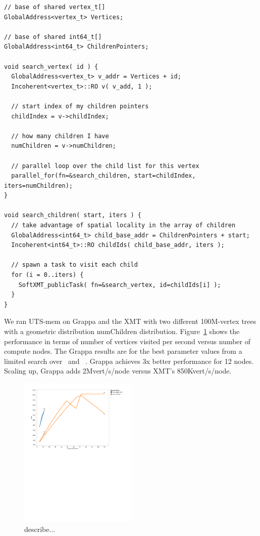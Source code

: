 \lstset{language=C++,
       basicstyle=\footnotesize,
       tabsize=2}
\begin{lstlisting}
// base of shared vertex_t[]
GlobalAddress<vertex_t> Vertices;        

// base of shared int64_t[]
GlobalAddress<int64_t> ChildrenPointers;  

void search_vertex( id ) {
  GlobalAddress<vertex_t> v_addr = Vertices + id;
  Incoherent<vertex_t>::RO v( v_add, 1 );

  // start index of my children pointers
  childIndex = v->childIndex;    

  // how many children I have
  numChildren = v->numChildren;  

  // parallel loop over the child list for this vertex
  parallel_for(fn=&search_children, start=childIndex, iters=numChildren);
}

void search_children( start, iters ) {
  // take advantage of spatial locality in the array of children
  GlobalAddress<int64_t> child_base_addr = ChildrenPointers + start;
  Incoherent<int64_t>::RO childIds( child_base_addr, iters );

  // spawn a task to visit each child
  for (i = 0..iters) {
    SoftXMT_publicTask( fn=&search_vertex, id=childIds[i] );
  }
}
\end{lstlisting}

We ran UTS-mem on Grappa and the XMT with two different 100M-vertex trees with a geometric distribution numChildren distribution. Figure~\ref{fig:grappa-xmt-uts} shows the performance in terms of number of vertices visited per second versus number of compute nodes. The Grappa results are for the best parameter values from a limited search over \flushtimeout~and \asyncforthr~. Grappa achieves 3x better performance for 12 nodes. Scaling up, Grappa adds 2Mvert/s/node versus XMT's 850Kvert/s/node.



\begin{figure}[h]
    \begin{center}
        \includegraphics[width=0.5\textwidth]{figs/grappa-xmt-uts.pdf}
    \end{center}
    \caption{describe...}
    \label{fig:grappa-xmt-uts}
\end{figure}


